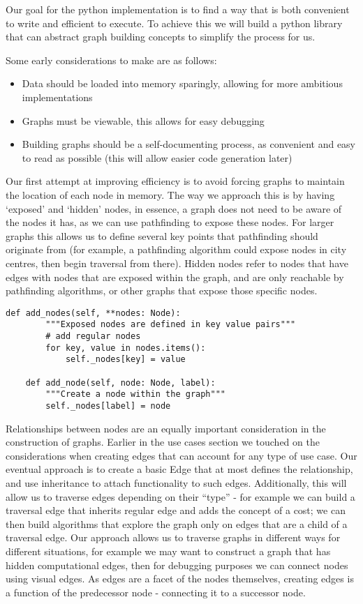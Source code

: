 Our goal for the python implementation is to find a way that is both convenient to write and efficient to execute.
To achieve this we will build a python library that can abstract graph building concepts to simplify the process for us.

Some early considerations to make are as follows:
\begin{itemize}
    \item {Data should be loaded into memory sparingly, allowing for more ambitious implementations}
    \item {Graphs must be viewable, this allows for easy debugging}
    \item {Building graphs should be a self-documenting process, as convenient and easy to read as possible
        (this will allow easier code generation later)}
\end{itemize}


Our first attempt at improving efficiency is to avoid forcing graphs to maintain the location of each node in memory.
The way we approach this is by having `exposed' and `hidden' nodes, in essence, a graph does not need to be aware
of the nodes it has, as we can use pathfinding to expose these nodes.
For larger graphs this allows us to define several key points that pathfinding should originate from (for example,
a pathfinding algorithm could expose nodes in city centres, then begin traversal from there).
Hidden nodes refer to nodes that have edges with nodes that are exposed within the graph, and are only reachable by
pathfinding algorithms, or other graphs that expose those specific nodes.

\begin{lstlisting}[caption={Adding nodes to a graph},captionpos=b,label={lst:hidden-visible-nodes}]
    def add_nodes(self, **nodes: Node):
        """Exposed nodes are defined in key value pairs"""
        # add regular nodes
        for key, value in nodes.items():
            self._nodes[key] = value

    def add_node(self, node: Node, label):
        """Create a node within the graph"""
        self._nodes[label] = node
\end{lstlisting}

Relationships between nodes are an equally important consideration in the construction of graphs.
Earlier in the use cases section we touched on the considerations when creating edges that can account for any type of
use case.
Our eventual approach is to create a basic Edge that at most defines the relationship, and use inheritance to attach
functionality to such edges.
Additionally, this will allow us to traverse edges depending on their ``type'' - for example we can build a traversal
edge that inherits regular edge and adds the concept of a cost; we can then build algorithms that explore the graph
only on edges that are a child of a traversal edge.
Our approach allows us to traverse graphs in different ways for different situations, for example we may want to
construct a graph that has hidden computational edges, then for debugging purposes we can connect nodes using
visual edges.
As edges are a facet of the nodes themselves, creating edges is a function of the predecessor node - connecting it to a
successor node.

